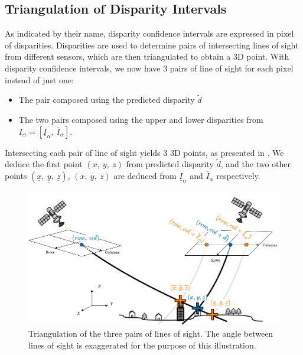 \subsection{Triangulation of Disparity Intervals}
As indicated by their name, disparity confidence intervals are expressed in pixel of disparities. Disparities are used to determine  pairs of intersecting lines of sight from different sensors, which are then triangulated to obtain a 3D point. With disparity confidence intervals, we now have 3 pairs of line of sight for each pixel instead of just one:
\begin{itemize}
    \item The pair composed using the predicted disparity $\tilde{d}$
    \item The two pairs composed using the upper and lower disparities from $I_\alpha=[\underline{I}_\alpha, ~\overline{I}_\alpha]$.
\end{itemize}
Intersecting each pair of line of sight yields $3$ 3D points, as presented in . We deduce the first point $(x, ~y, ~z)$ from predicted disparity $\tilde{d}$, and the two other points $(\underline{x}, ~\underline{y}, ~\underline{z})$, $(\overline{x}, ~\overline{y}, ~\overline{z})$ are deduced from $\underline{I}_\alpha$ and $\overline{I}_\alpha$ respectively.
\begin{figure}
    \centering
    \includegraphics[width=\linewidth]{Images/Chap_6/Pairs_of_line_of_sight.png}
    \caption{Triangulation of the three pairs of lines of sight. The angle between lines of sight is exaggerated for the purpose of this illustration.}
    \label{fig:pairs_of_line_of_sight}
\end{figure}

